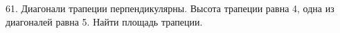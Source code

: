 61. Диагонали трапеции перпендикулярны. Высота трапеции равна 4, одна из диагоналей равна 5. Найти площадь трапеции.\\
